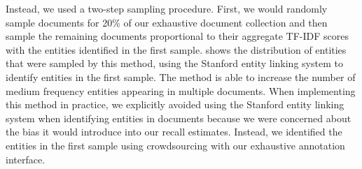 Instead, we used a two-step sampling procedure.
First, we would randomly sample documents for 20\% of our exhaustive document collection and then sample the remaining documents proportional to their aggregate TF-IDF scores with the entities identified in the first sample.
 shows the distribution of entities that were sampled by this method, using the Stanford entity linking system to identify entities in the first sample.
The method is able to increase the number of medium frequency entities appearing in multiple documents.
When implementing this method in practice, we explicitly avoided using the Stanford entity linking system when identifying entities in documents because we were concerned about the bias it would introduce into our recall estimates.
Instead, we identified the entities in the first sample using crowdsourcing with our exhaustive annotation interface.

